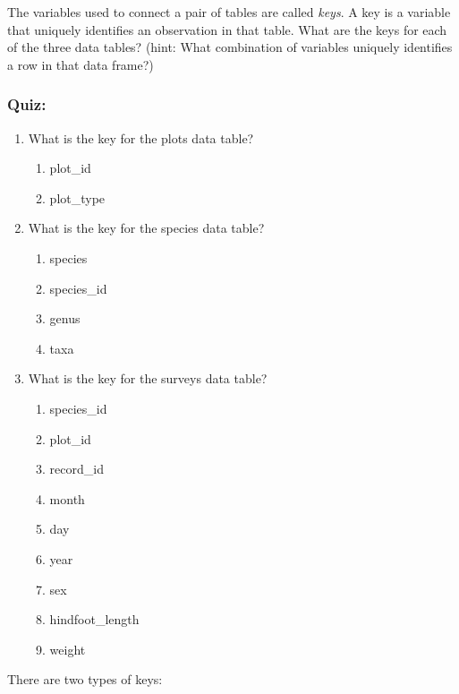 \documentclass[
  10pt,
  letterpaper,
  twoside,
  openright]{book}
\providecommand{\tightlist}{%
  \setlength{\itemsep}{0pt}\setlength{\parskip}{0pt}}
\begin{document}
The variables used to connect a pair of tables are called \emph{keys}. A
key is a variable that uniquely identifies an observation in that table.
What are the keys for each of the three data tables? (hint: What
combination of variables uniquely identifies a row in that data frame?)

\hypertarget{quiz}{%
\subsubsection{Quiz:}\label{quiz}}

\begin{enumerate}
\def\labelenumi{\arabic{enumi}.}
\item
  What is the key for the plots data table?

  \begin{enumerate}
  \def\labelenumii{\alph{enumii})}
  \tightlist
  \item
    plot\_id
  \item
    plot\_type
  \end{enumerate}
\item
  What is the key for the species data table?

  \begin{enumerate}
  \def\labelenumii{\alph{enumii})}
  \tightlist
  \item
    species
  \item
    species\_id
  \item
    genus
  \item
    taxa
  \end{enumerate}
\item
  What is the key for the surveys data table?

  \begin{enumerate}
  \def\labelenumii{\alph{enumii})}
  \tightlist
  \item
    species\_id
  \item
    plot\_id
  \item
    record\_id
  \item
    month
  \item
    day
  \item
    year
  \item
    sex
  \item
    hindfoot\_length
  \item
    weight
  \end{enumerate}
\end{enumerate}

There are two types of keys:
\end{document}
